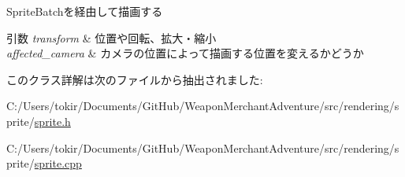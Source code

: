 Sprite\+Batchを経由して描画する 


\begin{DoxyParams}{引数}
{\em transform} & 位置や回転、拡大・縮小 \\
\hline
{\em affected\+\_\+camera} & カメラの位置によって描画する位置を変えるかどうか \\
\hline
\end{DoxyParams}


このクラス詳解は次のファイルから抽出されました\+:\begin{DoxyCompactItemize}
\item 
C\+:/\+Users/tokir/\+Documents/\+Git\+Hub/\+Weapon\+Merchant\+Adventure/src/rendering/sprite/\mbox{\hyperlink{sprite_8h}{sprite.\+h}}\item 
C\+:/\+Users/tokir/\+Documents/\+Git\+Hub/\+Weapon\+Merchant\+Adventure/src/rendering/sprite/\mbox{\hyperlink{sprite_8cpp}{sprite.\+cpp}}\end{DoxyCompactItemize}
